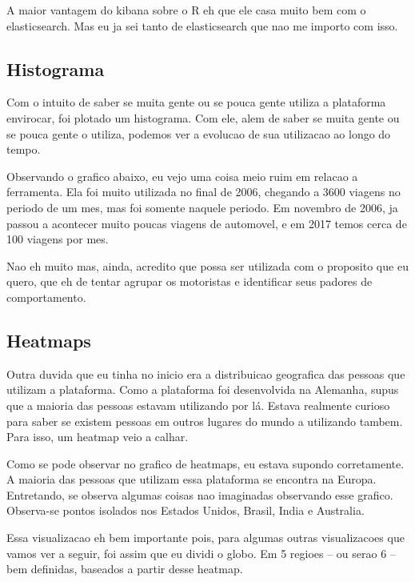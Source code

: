 \documentclass[10pt, conference]{IEEEtran}
\begin{document}
A maior vantagem do kibana sobre o R eh que ele casa muito bem com o elasticsearch. Mas
eu ja sei tanto de elasticsearch que nao me importo com isso.


\subsection{Histograma}
Com o intuito de saber se muita gente ou se pouca gente utiliza a plataforma envirocar,
foi plotado um histograma. Com ele, alem de saber se muita gente ou se pouca gente o utiliza,
podemos ver a evolucao de sua utilizacao ao longo do tempo.

Observando o grafico abaixo, eu vejo uma coisa meio ruim em relacao a ferramenta. Ela foi 
muito utilizada no final de 2006, chegando a 3600 viagens no periodo de um mes, mas foi
somente naquele periodo. Em novembro de 2006, ja passou a acontecer muito poucas viagens 
de automovel, e em 2017 temos cerca de 100 viagens por mes. 

Nao eh muito mas, ainda, acredito que possa ser utilizada com o proposito que eu quero, que eh
de tentar agrupar os motoristas e identificar seus padores de comportamento.



\subsection{Heatmaps}

Outra duvida que eu tinha no inicio era a distribuicao geografica das pessoas que utilizam a plataforma. 
Como a plataforma foi desenvolvida na Alemanha, supus que a maioria das pessoas estavam utilizando por lá. 
Estava realmente curioso para saber se existem pessoas em outros lugares do mundo a utilizando tambem. 
Para isso, um heatmap veio a calhar. 

Como se pode observar no grafico de heatmaps, eu estava supondo corretamente. A maioria das pessoas
que utilizam essa plataforma se encontra na Europa. Entretando, se observa algumas coisas nao imaginadas
observando esse grafico. Observa-se pontos isolados nos Estados Unidos, Brasil, India e Australia.

Essa visualizacao eh bem importante pois, para algumas outras visualizacoes que vamos ver a seguir, 
foi assim que eu dividi o globo. Em 5 regioes -- ou serao 6 -- bem definidas, baseados a partir desse
heatmap.
\end{document}
